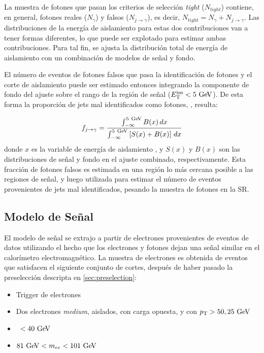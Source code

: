 La muestra de fotones que pasan los criterios de selección \emph{tight}
($N_{tight}$) contiene, en general, fotones reales ($N_{\gamma}$) y falsos
($N_{j\to\gamma}$), es decir, $N_{tight} = N_{\gamma} + N_{j\to\gamma}$.
Las distribuciones de la energía de aislamiento para estas
dos contribuciones van a tener formas diferentes, lo que puede ser explotado
para estimar ambas contribuciones. Para tal fin, se ajusta la distribución
total de energía de aislamiento con un combinación de modelos de señal y fondo.

El número de eventos de fotones falsos que pasa la identificación de fotones y
el corte de aislamiento puede ser estimado entonces integrando la componente de
fondo del ajuste sobre el rango de la región de señal ($\etiso<5\GeV$). De esta
forma la proporción de jets mal identificados como fotones, \fjg, resulta:

\begin{equation}\label{eq:jfake_formula}
  f_{j\to \gamma} = \frac{\int_{-\infty}^{5\gev} B(x)\, dx}{\int_{-\infty}^{5\gev} \left[S(x)+B(x)\right]\, dx}
\end{equation}
%
donde $x$ es la variable de energía de aislamiento \etiso, y $S(x)$ y $B(x)$ son
las distribuciones de señal y fondo en el ajuste combinado, respectivamente.
Esta fracción de fotones falsos es estimada en una región lo más cercana posible
a las regiones de señal, y luego utilizada para estimar el número de eventos
provenientes de jets mal identificados, pesando la muestra de fotones en la SR.




\subsection{Modelo de Señal} \label{sec:jfake_sig_template}

El modelo de señal se extrajo a partir de electrones provenientes de eventos de datos {\Zee}
utilizando el hecho que los
electrones y fotones dejan una señal similar en el calorímetro
electromagnético. La muestra de electrones es obtenida de eventos que satisfacen
el siguiente conjunto de cortes, después de haber pasado la preselección
descripta en \cref{sec:preselection}:

\begin{itemize}\itemsep0.1cm
\item Trigger de electrones %
\item Dos electrones \emph{medium}, aislados, con carga opuesta, y con $\pt>50,25\gev$
\item \MET\ $<40\gev$
\item $81\gev<m_{ee}<101\gev$
\end{itemize}


